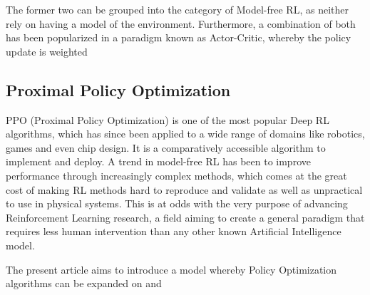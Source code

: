The former two can be grouped into the category of Model-free RL, as neither rely on having a model of the environment. Furthermore, a combination of both has been popularized in a paradigm known as Actor-Critic, whereby the policy update is weighted 


\subsection{Proximal Policy Optimization}

PPO (Proximal Policy Optimization)\cite{schulman2017proximal} is one of the most popular Deep RL algorithms, which has since been applied to a wide range of domains like robotics, games and even chip design\cite{mirhoseini2021graph}. It is a comparatively accessible algorithm to implement and deploy. A trend in model-free RL has been to improve performance through increasingly complex methods, which comes at the great cost of making RL methods hard to reproduce and validate as well as unpractical to use in physical systems. This is at odds with the very purpose of advancing Reinforcement Learning research, a field aiming to create a general paradigm that requires less human intervention than any other known Artificial Intelligence model. 


The present article aims to introduce a model whereby Policy Optimization algorithms can be expanded on and 



